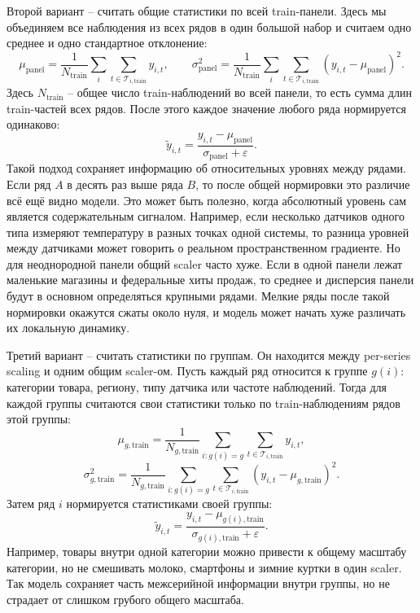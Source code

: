 \documentclass[12pt,fleqn]{article}
\begin{document}
Второй вариант -- считать общие статистики по всей train-панели.
Здесь мы объединяем все наблюдения из всех рядов в один большой набор и считаем одно среднее и одно стандартное отклонение:
\begin{equation}
  \mu_{\mathrm{panel}}
  =
  \frac{1}{N_{\mathrm{train}}}
  \sum_i \sum_{t \in \mathcal{T}_{i,\mathrm{train}}} y_{i,t},
  \qquad
  \sigma_{\mathrm{panel}}^2
  =
  \frac{1}{N_{\mathrm{train}}}
  \sum_i \sum_{t \in \mathcal{T}_{i,\mathrm{train}}}
  (y_{i,t}-\mu_{\mathrm{panel}})^2.
\end{equation}
Здесь $N_{\mathrm{train}}$ -- общее число train-наблюдений во всей панели, то есть сумма длин train-частей всех рядов.
После этого каждое значение любого ряда нормируется одинаково:
\begin{equation}
  \widetilde{y}_{i,t}
  =
  \frac{y_{i,t}-\mu_{\mathrm{panel}}}{\sigma_{\mathrm{panel}}+\varepsilon}.
\end{equation}
Такой подход сохраняет информацию об относительных уровнях между рядами.
Если ряд $A$ в десять раз выше ряда $B$, то после общей нормировки это различие всё ещё видно модели.
Это может быть полезно, когда абсолютный уровень сам является содержательным сигналом.
Например, если несколько датчиков одного типа измеряют температуру в разных точках одной системы, то разница уровней между датчиками может говорить о реальном пространственном градиенте.
Но для неоднородной панели общий scaler часто хуже.
Если в одной панели лежат маленькие магазины и федеральные хиты продаж, то среднее и дисперсия панели будут в основном определяться крупными рядами.
Мелкие ряды после такой нормировки окажутся сжаты около нуля, и модель может начать хуже различать их локальную динамику.

Третий вариант -- считать статистики по группам.
Он находится между per-series scaling и одним общим scaler-ом.
Пусть каждый ряд относится к группе $g(i)$: категории товара, региону, типу датчика или частоте наблюдений.
Тогда для каждой группы считаются свои статистики только по train-наблюдениям рядов этой группы:
\begin{equation}
  \mu_{g,\mathrm{train}}
  =
  \frac{1}{N_{g,\mathrm{train}}}
  \sum_{i:g(i)=g}
  \sum_{t \in \mathcal{T}_{i,\mathrm{train}}}
  y_{i,t},
\end{equation}
\begin{equation}
  \sigma_{g,\mathrm{train}}^2
  =
  \frac{1}{N_{g,\mathrm{train}}}
  \sum_{i:g(i)=g}
  \sum_{t \in \mathcal{T}_{i,\mathrm{train}}}
  (y_{i,t}-\mu_{g,\mathrm{train}})^2.
\end{equation}
Затем ряд $i$ нормируется статистиками своей группы:
\begin{equation}
  \widetilde{y}_{i,t}
  =
  \frac{y_{i,t}-\mu_{g(i),\mathrm{train}}}{\sigma_{g(i),\mathrm{train}}+\varepsilon}.
\end{equation}
Например, товары внутри одной категории можно привести к общему масштабу категории, но не смешивать молоко, смартфоны и зимние куртки в один scaler.
Так модель сохраняет часть межсерийной информации внутри группы, но не страдает от слишком грубого общего масштаба.
\end{document}
